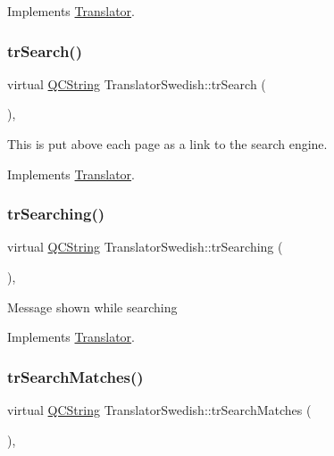 Implements \mbox{\hyperlink{class_translator}{Translator}}.

\mbox{\label{class_translator_swedish_a0361c5bc3a960c0ef49596aba8495ea5}} 
\subsubsection{\texorpdfstring{trSearch()}{trSearch()}}
{\footnotesize\ttfamily virtual \mbox{\hyperlink{class_q_c_string}{Q\+C\+String}} Translator\+Swedish\+::tr\+Search (\begin{DoxyParamCaption}{ }\end{DoxyParamCaption})\hspace{0.3cm}{\ttfamily [inline]}, {\ttfamily [virtual]}}

This is put above each page as a link to the search engine. 

Implements \mbox{\hyperlink{class_translator}{Translator}}.

\mbox{\label{class_translator_swedish_a1579177085bb5ee89d1ff7d5fd9ce505}} 
\subsubsection{\texorpdfstring{trSearching()}{trSearching()}}
{\footnotesize\ttfamily virtual \mbox{\hyperlink{class_q_c_string}{Q\+C\+String}} Translator\+Swedish\+::tr\+Searching (\begin{DoxyParamCaption}{ }\end{DoxyParamCaption})\hspace{0.3cm}{\ttfamily [inline]}, {\ttfamily [virtual]}}

Message shown while searching 

Implements \mbox{\hyperlink{class_translator}{Translator}}.

\mbox{\label{class_translator_swedish_a33aaa6094ac5a9c302227c746384e7c0}} 
\subsubsection{\texorpdfstring{trSearchMatches()}{trSearchMatches()}}
{\footnotesize\ttfamily virtual \mbox{\hyperlink{class_q_c_string}{Q\+C\+String}} Translator\+Swedish\+::tr\+Search\+Matches (\begin{DoxyParamCaption}{ }\end{DoxyParamCaption})\hspace{0.3cm}{\ttfamily [inline]}, {\ttfamily [virtual]}}

